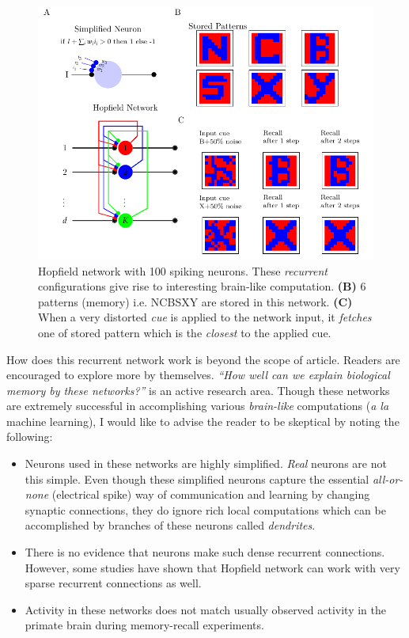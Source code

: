 \documentclass[]{resonance}
\begin{document}
\begin{figure}[!b]
    \centering
    \caption{Hopfield network with 100 spiking neurons. These \emph{recurrent} 
        configurations give rise to interesting brain-like
        computation. \textbf{(B)} 6 patterns (memory) i.e. NCBSXY are stored in this
        network. \textbf{(C)} When a very distorted \textit{cue} is applied to
        the network input, it \textit{fetches} one of stored pattern which is
        the \emph{closest} to the applied cue.
    }\label{fig:hopfield}
    \includegraphics[width=\linewidth]{./figures/hopfield.pdf}
\end{figure}

How does this recurrent network work is beyond the scope of article. Readers are
encouraged to explore more by themselves. \emph{``How well can we explain
biological memory by these networks?''} is an active research area.  Though
these networks are extremely successful in accomplishing various
\textit{brain-like} computations (\textit{a la} machine learning), I would like
to advise the reader to be skeptical by noting the following:

\begin{itemize}
    \item  Neurons used in these networks are highly simplified. \textit{Real}
        neurons are not this simple. Even though these simplified neurons
        capture the essential \textit{all-or-none} (electrical spike) way of
        communication and learning by changing synaptic connections, they do
        ignore rich local computations which can be accomplished by branches of
        these neurons called \textit{dendrites}.
    \item  There is no evidence that neurons make such dense recurrent
        connections. However, some studies have shown that Hopfield network can
        work with very sparse recurrent connections as well.
    \item Activity in these networks does not match usually observed activity 
        in the primate brain during memory-recall experiments.
\end{itemize}
\end{document}
